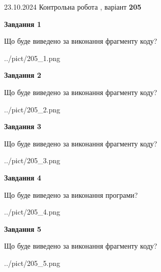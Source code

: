 \documentclass[12pt, ukrainian]{article}
\begin{document}
{\Large{23.10.2024 Контрольна робота , варіант  \No \textbf { 205 }\par}}
{
\begin {large}
{\begin {center}\textbf{Завдання 1}\end {center}}

Що буде виведено за виконання фрагменту коду?\par
\begin{center}
	{../pict/205_1.png}
\end{center}
\newpage

{\begin {center}\textbf{Завдання 2}\end {center}}

Що буде виведено за виконання фрагменту коду?\par
\begin{center}
	{../pict/205_2.png}
\end{center}
\newpage

{\begin {center}\textbf{Завдання 3}\end {center}}

Що буде виведено за виконання фрагменту коду?\par
\begin{center}
	{../pict/205_3.png}
\end{center}
\newpage

{\begin {center}\textbf{Завдання 4}\end {center}}

Що буде виведено за виконання програми?\par
\begin{center}
	{../pict/205_4.png}
\end{center}
\newpage

{\begin {center}\textbf{Завдання 5}\end {center}}

Що буде виведено за виконання фрагменту коду?\par
\begin{center}
	{../pict/205_5.png}
\end{center}
\newpage


\end{large}}
\end{document}
